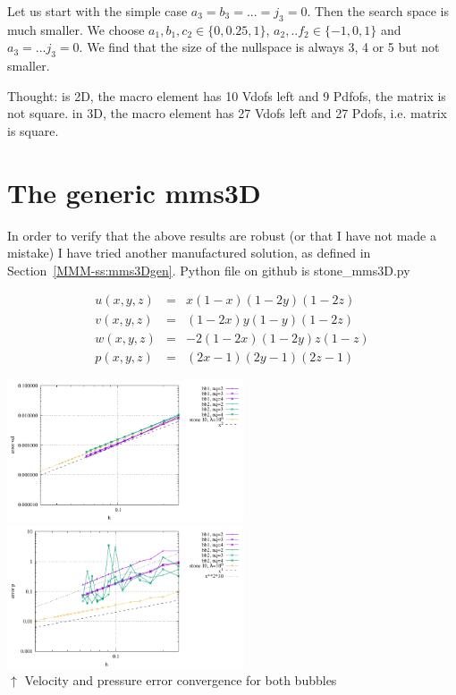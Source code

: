 Let us start with the simple case $a_3=b_3=...=j_3=0$. Then the search space is much smaller.
We choose $a_1,b_1,c_2 \in \{0,0.25,1\}$, $a_2,..f_2\in \{ -1,0,1\}$ and $a_3=...j_3=0$.
We find that the size of the nullspace is always 3, 4 or 5 but not smaller.

Thought: is 2D, the macro element has 10 Vdofs left and 9 Pdfofs, the matrix is not square. in 3D, the macro element has 27 Vdofs left and 27 Pdofs, i.e. matrix is square. 

\newpage
\section*{The generic mms3D} In order to verify that 
the above results are robust (or that I have not made a mistake)
I have tried another manufactured solution, as defined in Section~\ref{MMM-ss:mms3Dgen}. 
Python file on github is {\pythonfile stone\_mms3D.py}

\begin{eqnarray}
u(x,y,z) &=& x(1-x)(1-2y)(1-2z)\\
v(x,y,z) &=& (1-2x) y(1-y) (1-2z) \\
w(x,y,z) &=& -2(1-2x)(1-2y)z(1-z) \\
p(x,y,z) &=& (2x-1)(2y-1)(2z-1)
\end{eqnarray}

\begin{center}
\includegraphics[width=7cm]{python_codes/fieldstone_75/results/mms3D/errorsV.pdf}
\includegraphics[width=7cm]{python_codes/fieldstone_75/results/mms3D/errorsP.pdf}\\
{\captionfont $\uparrow$ Velocity and pressure error convergence for both bubbles}
\end{center}

